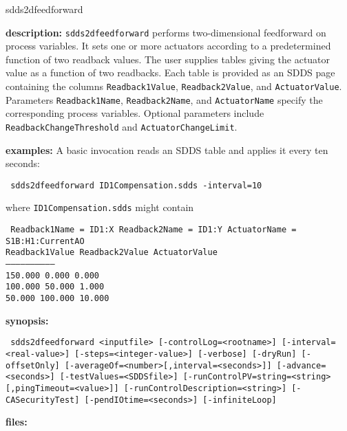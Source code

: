 \begin{sddsprog}{sdds2dfeedforward}
\item {\bf description:}
\verb+sdds2dfeedforward+ performs two-dimensional feedforward on process variables.
It sets one or more actuators according to a predetermined function of two readback
values.  The user supplies tables giving the actuator value as a function of two
readbacks.  Each table is provided as an SDDS page containing the columns
\verb+Readback1Value+, \verb+Readback2Value+, and \verb+ActuatorValue+.  Parameters
\verb+Readback1Name+, \verb+Readback2Name+, and \verb+ActuatorName+ specify the
corresponding process variables.  Optional parameters include
\verb+ReadbackChangeThreshold+ and \verb+ActuatorChangeLimit+.

\item {\bf examples:}
A basic invocation reads an SDDS table and applies it every ten seconds:
\begin{flushleft}{\tt
sdds2dfeedforward ID1Compensation.sdds -interval=10
}\end{flushleft}
where \verb+ID1Compensation.sdds+ might contain
\begin{flushleft}{\tt
Readback1Name = ID1:X \quad Readback2Name = ID1:Y \quad ActuatorName = S1B:H1:CurrentAO\\
 Readback1Value  Readback2Value  ActuatorValue\\
------------------------------\\
       150.000       0.000          0.000\\
       100.000      50.000          1.000\\
        50.000     100.000         10.000\\
}\end{flushleft}
\item {\bf synopsis:}
\begin{flushleft}{\tt
sdds2dfeedforward <inputfile>\
       [-controlLog=<rootname>]\
       [-interval=<real-value>] [-steps=<integer-value>]\
       [-verbose] [-dryRun] [-offsetOnly]\
       [-averageOf=<number>[,interval=<seconds>]]\
       [-advance=<seconds>]\
       [-testValues=<SDDSfile>]\
       [-runControlPV=string=<string>[,pingTimeout=<value>]]\
       [-runControlDescription=<string>]\
       [-CASecurityTest]\
       [-pendIOtime=<seconds>] [-infiniteLoop]
}\end{flushleft}
\item {\bf files:}
\begin{itemize}

\end{itemize}
\end{sddsprog}
